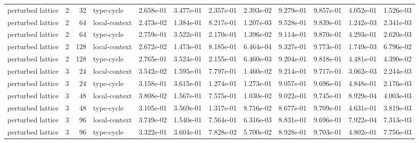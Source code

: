 \begin{tabular}{lrrlrrrrrrrr}
perturbed lattice & 2 & 32 & type-cycle & 2.658e-01 & 3.477e-01 & 2.357e-01 & 2.393e-02 & 9.279e-01 & 9.857e-01 & 4.052e-01 & 1.526e-03 \\
perturbed lattice & 2 & 64 & local-context & 2.473e-02 & 1.384e-01 & 8.217e-01 & 1.207e-03 & 9.528e-01 & 9.839e-01 & 1.242e-03 & 2.341e-03 \\
perturbed lattice & 2 & 64 & type-cycle & 2.759e-01 & 3.522e-01 & 2.170e-01 & 1.396e-02 & 9.114e-01 & 9.870e-01 & 4.293e-01 & 2.620e-03 \\
perturbed lattice & 2 & 128 & local-context & 2.672e-02 & 1.473e-01 & 8.185e-01 & 6.464e-04 & 9.327e-01 & 9.773e-01 & 1.749e-03 & 6.796e-02 \\
perturbed lattice & 2 & 128 & type-cycle & 2.765e-01 & 3.524e-01 & 2.155e-01 & 6.460e-03 & 9.204e-01 & 9.818e-01 & 4.481e-01 & 4.390e-02 \\
perturbed lattice & 3 & 24 & local-context & 3.542e-02 & 1.595e-01 & 7.797e-01 & 1.460e-02 & 9.214e-01 & 9.717e-01 & 3.062e-03 & 2.244e-03 \\
perturbed lattice & 3 & 24 & type-cycle & 3.158e-01 & 3.615e-01 & 1.274e-01 & 1.273e-01 & 9.057e-01 & 9.696e-01 & 4.848e-01 & 2.176e-03 \\
perturbed lattice & 3 & 48 & local-context & 3.808e-02 & 1.567e-01 & 7.575e-01 & 1.030e-02 & 9.022e-01 & 9.745e-01 & 8.929e-04 & 4.003e-03 \\
perturbed lattice & 3 & 48 & type-cycle & 3.105e-01 & 3.569e-01 & 1.317e-01 & 8.716e-02 & 8.677e-01 & 9.709e-01 & 4.631e-01 & 3.819e-03 \\
perturbed lattice & 3 & 96 & local-context & 3.749e-02 & 1.540e-01 & 7.564e-01 & 6.316e-03 & 8.831e-01 & 9.696e-01 & 7.922e-04 & 7.313e-03 \\
perturbed lattice & 3 & 96 & type-cycle & 3.322e-01 & 3.604e-01 & 7.828e-02 & 5.700e-02 & 8.928e-01 & 9.703e-01 & 4.802e-01 & 7.756e-03 \\
\bottomrule
\end{tabular}
